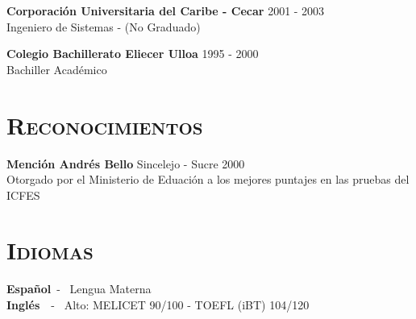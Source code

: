 \begin{resume}
\textbf{Corporaci\'{o}n Universitaria del Caribe  - Cecar} \hfill  2001 - 2003  \\
{Ingeniero de Sistemas - (No Graduado) } \hfill 

\textbf{Colegio Bachillerato Eliecer Ulloa} \hfill  1995 - 2000  \\
{Bachiller Acad\'{e}mico} \hfill


\section{\textsc{Reconocimientos}}
\textbf{Menci\'{o}n Andr\'{e}s Bello} \hfill  Sincelejo - Sucre 2000  \\
Otorgado por el Ministerio de Eduaci\'{o}n a los mejores puntajes en
las pruebas del ICFES \hfill \\

\section{\textsc{Idiomas}}
\textbf{Espa\~{n}ol}\   - \  Lengua Materna \\
\textbf{Ingl\'{e}s}\ \  - \  Alto:  MELICET 90/100 - TOEFL (iBT) 104/120\\




\end{resume}
